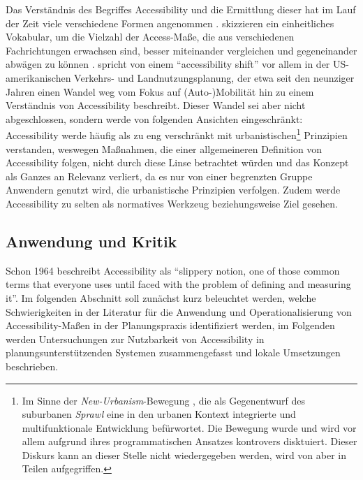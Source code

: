 \documentclass[11pt,pdftex,a4paper]{scrartcl}
\begin{document}
	Das Verständnis des Begriffes Accessibility und die Ermittlung dieser hat im Lauf der Zeit viele verschiedene Formen angenommen \parencite[vgl.][]{levineCenturyEvolutionAccessibility2020}. \textcite{wuUnifyingAccess2020} skizzieren ein einheitliches Vokabular, um die Vielzahl der Access-Maße, die aus verschiedenen Fachrichtungen erwachsen sind, besser miteinander vergleichen und gegeneinander abwägen zu können \parencite[2]{wuUnifyingAccess2020}. \textcite{levineCenturyEvolutionAccessibility2020} spricht von einem \enquote{accessibility shift} vor allem in der US-amerikanischen Verkehrs- und Landnutzungsplanung, der etwa seit den neunziger Jahren einen Wandel weg vom Fokus auf (Auto-)Mobilität hin zu einem Verständnis von Accessibility beschreibt. Dieser Wandel sei aber nicht abgeschlossen, sondern werde von folgenden Ansichten eingeschränkt: Accessibility werde häufig als zu eng verschränkt mit urbanistischen\footnote{\label{fn:newurbanism}Im Sinne der \textit{New-Urbanism}-Bewegung \parencite[vgl.][]{CNUCharterNewUrbanism2015}, die als Gegenentwurf des suburbanen \textit{Sprawl} eine in den urbanen Kontext integrierte und multifunktionale Entwicklung befürwortet. Die Bewegung wurde und wird vor allem aufgrund ihres programmatischen Ansatzes kontrovers disktuiert. Dieser Diskurs kann an dieser Stelle nicht wiedergegeben werden, wird von \citeauthor{levineCenturyEvolutionAccessibility2020} aber in Teilen aufgegriffen.} Prinzipien verstanden, weswegen Maßnahmen, die einer allgemeineren Definition von Accessibility folgen, nicht durch diese Linse betrachtet würden und das Konzept als Ganzes an Relevanz verliert, da es nur von einer begrenzten Gruppe Anwendern genutzt wird, die urbanistische Prinzipien verfolgen. Zudem werde Accessibility zu selten als normatives Werkzeug beziehungsweise Ziel gesehen.
	
	\subsection{Anwendung und Kritik}
	\label{sec:AccessKritik}
	Schon 1964 beschreibt \textcite[72]{gouldSpatialDiffusionResource1969} Accessibility als \enquote{slippery notion, \textelp{} one of those common terms that everyone uses until faced with the problem of defining and measuring it}. Im folgenden Abschnitt soll zunächst kurz beleuchtet werden, welche Schwierigkeiten in der Literatur für die Anwendung und Operationalisierung von Accessibility-Maßen in der Planungspraxis identifiziert werden, im Folgenden werden Untersuchungen zur Nutzbarkeit von Accessibility in planungsunterstützenden Systemen zusammengefasst und lokale Umsetzungen beschrieben.
	
\end{document}
